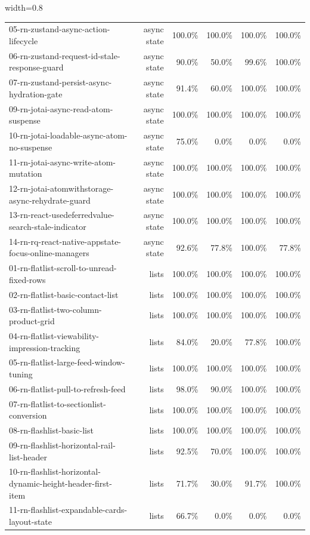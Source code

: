 \begin{table}[htbp]
\begin{adjustbox}{width=0.8\textwidth}
\begin{tabular}{lrrrrr}
05-rn-zustand-async-action-lifecycle & async state & 100.0\% & 100.0\% & 100.0\% & 100.0\% \\
06-rn-zustand-request-id-stale-response-guard & async state & 90.0\% & 50.0\% & 99.6\% & 100.0\% \\
07-rn-zustand-persist-async-hydration-gate & async state & 91.4\% & 60.0\% & 100.0\% & 100.0\% \\
09-rn-jotai-async-read-atom-suspense & async state & 100.0\% & 100.0\% & 100.0\% & 100.0\% \\
10-rn-jotai-loadable-async-atom-no-suspense & async state & 75.0\% & 0.0\% & 0.0\% & 0.0\% \\
11-rn-jotai-async-write-atom-mutation & async state & 100.0\% & 100.0\% & 100.0\% & 100.0\% \\
12-rn-jotai-atomwithstorage-async-rehydrate-guard & async state & 100.0\% & 100.0\% & 100.0\% & 100.0\% \\
13-rn-react-usedeferredvalue-search-stale-indicator & async state & 100.0\% & 100.0\% & 100.0\% & 100.0\% \\
14-rn-rq-react-native-appstate-focus-online-managers & async state & 92.6\% & 77.8\% & 100.0\% & 77.8\% \\
01-rn-flatlist-scroll-to-unread-fixed-rows & lists & 100.0\% & 100.0\% & 100.0\% & 100.0\% \\
02-rn-flatlist-basic-contact-list & lists & 100.0\% & 100.0\% & 100.0\% & 100.0\% \\
03-rn-flatlist-two-column-product-grid & lists & 100.0\% & 100.0\% & 100.0\% & 100.0\% \\
04-rn-flatlist-viewability-impression-tracking & lists & 84.0\% & 20.0\% & 77.8\% & 100.0\% \\
05-rn-flatlist-large-feed-window-tuning & lists & 100.0\% & 100.0\% & 100.0\% & 100.0\% \\
06-rn-flatlist-pull-to-refresh-feed & lists & 98.0\% & 90.0\% & 100.0\% & 100.0\% \\
07-rn-flatlist-to-sectionlist-conversion & lists & 100.0\% & 100.0\% & 100.0\% & 100.0\% \\
08-rn-flashlist-basic-list & lists & 100.0\% & 100.0\% & 100.0\% & 100.0\% \\
09-rn-flashlist-horizontal-rail-list-header & lists & 92.5\% & 70.0\% & 100.0\% & 100.0\% \\
10-rn-flashlist-horizontal-dynamic-height-header-first-item & lists & 71.7\% & 30.0\% & 91.7\% & 100.0\% \\
11-rn-flashlist-expandable-cards-layout-state & lists & 66.7\% & 0.0\% & 0.0\% & 0.0\% \\

\end{tabular}
\end{adjustbox}
\end{table}
